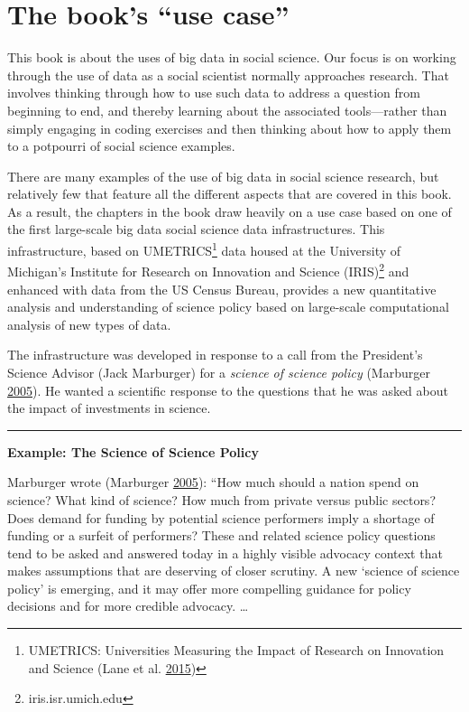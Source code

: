 \documentclass[]{krantz}
\begin{document}
\section{\texorpdfstring{The book's ``use
case''}{The book's use case}}\label{sec:1-6}

This book is about the uses of big data in social science. Our focus is
on working through the use of data as a social scientist normally
approaches research. That involves thinking through how to use such data
to address a question from beginning to end, and thereby learning about
the associated tools---rather than simply engaging in coding exercises
and then thinking about how to apply them to a potpourri of social
science examples.

There are many examples of the use of big data in social science
research, but relatively few that feature all the different aspects that
are covered in this book. As a result, the chapters in the book draw
heavily on a use case based on one of the first large-scale big data
social science data infrastructures. This infrastructure, based on
UMETRICS\footnote{UMETRICS: Universities Measuring the Impact of
  Research on Innovation and Science (Lane et al.
  \protect\hyperlink{ref-lane2015new}{2015})} data housed at the
University of Michigan's Institute for Research on Innovation and
Science (IRIS)\footnote{iris.isr.umich.edu} and enhanced with data from
the US Census Bureau, provides a new quantitative analysis and
understanding of science policy based on large-scale computational
analysis of new types of data.

The infrastructure was developed in response to a call from the
President's Science Advisor (Jack Marburger) for a \emph{science of
science policy} (Marburger
\protect\hyperlink{ref-marburger2005wanted}{2005}). He wanted a
scientific response to the questions that he was asked about the impact
of investments in science.

\begin{center}\rule{0.5\linewidth}{\linethickness}\end{center}

\textbf{Example: The Science of Science Policy}

Marburger wrote (Marburger
\protect\hyperlink{ref-marburger2005wanted}{2005}): ``How much should a
nation spend on science? What kind of science? How much from private
versus public sectors? Does demand for funding by potential science
performers imply a shortage of funding or a surfeit of performers? These
and related science policy questions tend to be asked and answered today
in a highly visible advocacy context that makes assumptions that are
deserving of closer scrutiny. A new `science of science policy' is
emerging, and it may offer more compelling guidance for policy decisions
and for more credible advocacy. \ldots{}
\end{document}
